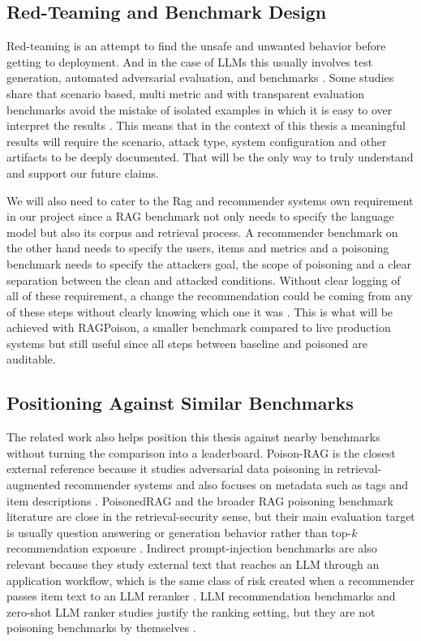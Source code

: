 \subsection{Red-Teaming and Benchmark Design}

Red-teaming is an attempt to find the unsafe and unwanted behavior before getting to deployment. And in the case of LLMs this usually involves test generation, automated adversarial evaluation, and benchmarks \cite{perez2022redteaming,mazeika2024harmbench}. Some studies share that scenario based, multi metric and with transparent evaluation benchmarks avoid the mistake of isolated examples in which it is easy to over interpret the results \cite{liang2023helm}. This means that in the context of this thesis a meaningful results will require the scenario, attack type, system configuration and other artifacts to be deeply documented. That will be the only way to truly understand and support our future claims.

We will also need to cater to the Rag and recommender systems own requirement in our project since a RAG benchmark not only needs to specify the language model but also its corpus and retrieval process. A recommender benchmark on the other hand needs to specify the users, items and metrics and a poisoning benchmark needs to specify the attackers goal, the scope of poisoning and a clear separation between the clean and attacked conditions. Without clear logging of all of these requirement, a change the recommendation could be coming from any of these steps without clearly knowing which one it was \cite{thakur2021beir,liang2023helm,zhang2025ragpoisonbench}. This is what will be achieved with RAGPoison, a smaller benchmark compared to live production systems but still useful since all steps between baseline and poisoned are auditable.



\subsection{Positioning Against Similar Benchmarks}

The related work also helps position this thesis against nearby benchmarks without turning the comparison into a leaderboard. Poison-RAG is the closest external reference because it studies adversarial data poisoning in retrieval-augmented recommender systems and also focuses on metadata such as tags and item descriptions \cite{nazary2025poisonrag}. PoisonedRAG and the broader RAG poisoning benchmark literature are close in the retrieval-security sense, but their main evaluation target is usually question answering or generation behavior rather than top-$k$ recommendation exposure \cite{zou2025poisonedrag_usenix,zhang2025ragpoisonbench}. Indirect prompt-injection benchmarks are also relevant because they study external text that reaches an LLM through an application workflow, which is the same class of risk created when a recommender passes item text to an LLM reranker \cite{yi2025bipia}. LLM recommendation benchmarks and zero-shot LLM ranker studies justify the ranking setting, but they are not poisoning benchmarks by themselves \cite{hou2024llmrankers,liu2023llmrecbench,geng2023p5}.

